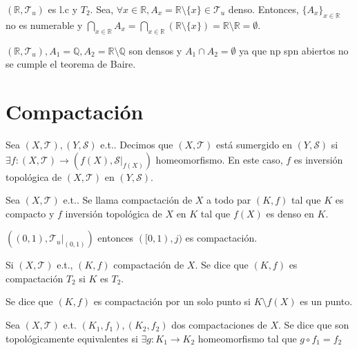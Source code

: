 \begin{ejm}
  $( \mathbb{R}, \mathcal{T}_{u} )$ es l.c y $T_{2}$. Sea, $\forall x \in \mathbb{R}, A_{x} = \mathbb{R} \setminus \{ x \} \in \mathcal{T}_{u}$ denso. Entonces, $\{ A_{x} \}_{x \in \mathbb{R}}$ no es numerable y $\bigcap_{x \in \mathbb{R}} A_{x} = \bigcap_{x \in \mathbb{R}}( \mathbb{R} \setminus \{ x \}) = \mathbb{R} \setminus \mathbb{R} = \emptyset$.
\end{ejm}

\begin{ejm}
  $( \mathbb{R}, \mathcal{T}_{u} ), A_{1} = \mathbb{Q}, A_{2} = \mathbb{R} \setminus \mathbb{Q}$ son densos y $ A_{1} \cap A_{2} = \emptyset$ ya que np spn abiertos no se cumple el teorema de Baire.
\end{ejm}

\section{Compactación}

\begin{defn}
  Sea $( X, \mathcal{T} ), ( Y, \mathcal{S} )$ e.t.. Decimos que $( X, \mathcal{T} )$ está sumergido en $( Y, \mathcal{S} )$ si $\exists f :  ( X, \mathcal{T} ) \to ( f(X), \mathcal{S}|_{f(X)})$ homeomorfismo. En este caso, $f$ es inversión topológica de $( X, \mathcal{T} )$ en $( Y, \mathcal{S} )$.
\end{defn}

\begin{defn}[Compactación]
  Sea $( X, \mathcal{T} )$ e.t.. Se llama compactación de $X$ a todo par $(K, f)$ tal que $ K$ es compacto y $f$ inversión topológica de $X$ en $K$ tal que $f(X)$ es denso en $K$.
\end{defn}

\begin{ejm}
  $( (0, 1), \mathcal{T}_{u}|_{(0, 1)})$ entonces $( [0, 1), j )$ es compactación.
\end{ejm}

\begin{defn}[Compactación $T_2$]
  Si $( X, \mathcal{T} )$ e.t., $( K, f )$ compactación de $X$. Se dice que $( K, f )$ es compactación $T_{2}$ si $K$ es $T_{2}$.

  Se dice que $( K, f )$ es compactación por un solo punto si $K \setminus f(X)$ es un punto.
\end{defn}

\begin{defn}
  Sea $( X, \mathcal{T} )$ e.t. $( K_{1}, f_{1} ), ( K_{2}, f_{2} )$ dos compactaciones de $X$. Se dice que son topológicamente equivalentes si $\exists g : K_{1} \to K_{2}$ homeomorfismo tal que $g \circ f_{1} = f_{2}$
\end{defn}


